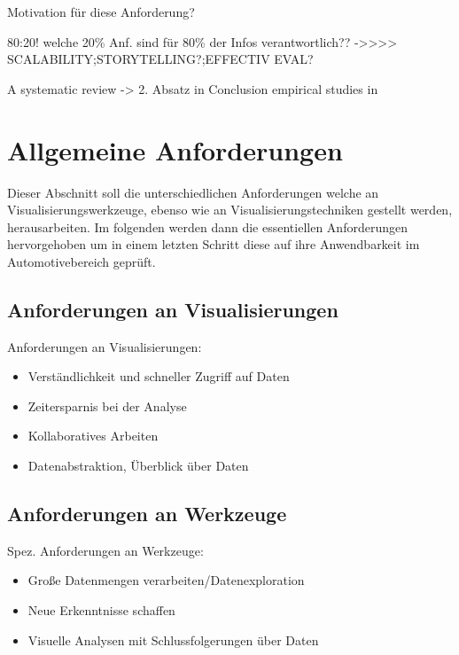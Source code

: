 \documentclass[draft=false
              ,paper=a4
              ,twoside=false
              ,fontsize=11pt
              ,headsepline
              ,BCOR10mm
              ,DIV11
              ]{scrbook}
\begin{document}
Motivation für diese Anforderung?

80:20! welche 20\% Anf. sind für 80\% der Infos verantwortlich??\newline
->>>> SCALABILITY;STORYTELLING?;EFFECTIV EVAL?

A systematic review -> 2. Absatz in Conclusion \cite{isenberg_systematic_2013} \newline
empirical studies in \cite{lam_empirical_2012}

\section{Allgemeine Anforderungen} %
\label{sec:allgemeine_anforderungen}
Dieser Abschnitt soll die unterschiedlichen Anforderungen welche an Visualisierungswerkzeuge, ebenso wie an Visualisierungstechniken gestellt werden, herausarbeiten. Im folgenden werden dann die essentiellen Anforderungen hervorgehoben um in einem letzten Schritt diese auf ihre Anwendbarkeit im Automotivebereich geprüft.


\subsection{Anforderungen an Visualisierungen} %
\label{sub:anforderungen_an_visualisierungen}

Anforderungen an Visualisierungen:

\begin{itemize}
  \item Verständlichkeit und schneller Zugriff auf Daten
  \item Zeitersparnis bei der Analyse
  \item Kollaboratives Arbeiten
  \item Datenabstraktion, Überblick über Daten
\end{itemize}

\subsection{Anforderungen an Werkzeuge} %
\label{sub:anforderungen_an_werkzeuge}

Spez. Anforderungen an Werkzeuge:

\begin{itemize}
  \item Große Datenmengen verarbeiten/Datenexploration 
  \item Neue Erkenntnisse schaffen
  \item Visuelle Analysen mit Schlussfolgerungen über Daten
\end{itemize}
\end{document}
